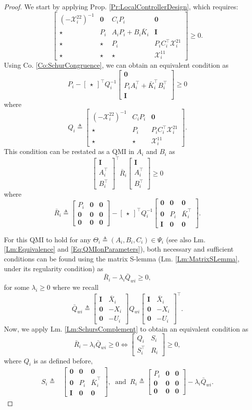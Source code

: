 \documentclass[letterpaper, 10 pt, conference]{ieeeconf}%
\newcommand{\T}{\top}
\newcommand{\I}{\mathbf{I}}
\newcommand{\0}{\mathbf{0}}
\newcommand{\X}{\mathcal{X}}
\newcommand{\bm}[1]{\begin{bmatrix}#1\end{bmatrix}}
\begin{document}
\begin{proof}
We start by applying Prop. \ref{Pr:LocalControllerDesign}, which requires:
$$
\bm{ 
(-\X_i^{22})^{-1} & \0 & C_iP_i & \0 \\
\star & P_i & A_iP_i+B_i\bar{K}_i & \I \\
\star & \star & P_i  & P_iC_i^\T \X^{21}_i\\
\star & \star & \star & \X^{11}_i } \geq 0. 
$$
Using Co. \ref{Co:SchurCongruence}, we can obtain an equivalent condition as
$$P_i - \bm{\star}^\T Q_i^{-1} \bm{\0 \\ P_i A_i^\T + \bar{K}_i^\T B_i^\T \\ \I} \geq 0$$
where 
$$Q_i \triangleq  
\bm{ 
(-\X_i^{22})^{-1} & C_iP_i & \0 \\
\star & P_i  & P_iC_i^\T \X^{21}_i\\
\star & \star & \X^{11}_i }. 
$$
This condition can be restated as a QMI in $A_i$ and $B_i$ as 
$$\bm{\I \\ A_i^\T \\ B_i^\T}^\T  \bar{R}_i \bm{\I \\ A_i^\T \\ B_i^\T} \geq 0$$
where 
$$
\bar{R}_i \triangleq \bm{P_i & \0 & \0 \\ \0 & \0 & \0 \\ \0 & \0 & \0 } - \bm{\star}^\T Q_i^{-1} \bm{\0 & \0 & \0 \\ \0 & P_i & \bar{K}_i^\T \\ \I & \0 & \0}.
$$


For this QMI to hold for any $\Theta_i \triangleq (A_i,B_i,C_i) \in \Psi_i$ (see also Lm. \ref{Lm:Equivalence} and \eqref{Eq:QMIonParameters}), both necessary and sufficient conditions can be found using the matrix S-lemma (Lm. \ref{Lm:MatrixSLemma}, under its regularity condition) as
$$
\bar{R}_i - \lambda_i \bar{Q}_{wi} \geq 0,
$$
for some $\lambda_i \geq 0$ where we recall
$$
\bar{Q}_{wi} \triangleq \bm{\I & \bar{X}_i \\ \0 & -X_i \\ \0 & -U_i} Q_{wi} \bm{\I & \bar{X}_i \\ \0 & -X_i \\ \0 & -U_i}^\T.
$$
Now, we apply Lm. \ref{Lm:SchursComplement} to obtain an equivalent condition as
$$
\bar{R}_i - \lambda_i \bar{Q}_{wi} \geq 0 \iff \bm{ Q_i & S_i \\ S_i^\T & R_i } \geq 0,
$$
where $Q_i$ is as defined before,  
\begin{align*}
S_i \triangleq& \bm{\0 & \0 & \0 \\ \0 & P_i & \bar{K}_i^\T \\ \I & \0 & \0},\ \mbox{ and }\ 
R_i \triangleq
\bm{P_i & \0 & \0 \\ \0 & \0 & \0 \\ \0 & \0 & \0 } - \lambda_i \bar{Q}_{wi}. 
\end{align*}


\end{proof}
\end{document}
